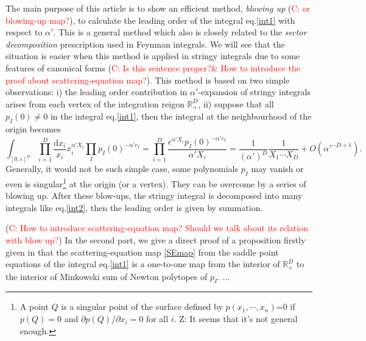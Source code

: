 \documentclass[12pt]{article}
\theoremstyle{definition}
\theoremstyle{plain}
\newcommand{\dif}{\mathrm{d}} %
\begin{document}
The main purpose of this article is to show an efficient method, {\it{blowing up}} (\textcolor{red}{C: or blowing-up map?}), to calculate the leading order of the integral eq.\eqref{int1} with respect to $\alpha'$. This is a general method which also is closely related to the {\it sector decomposition} prescription \cite{} used in Feynman integrals. We will see that the situation is easier when this method is applied in stringy integrals due to some features of canonical forms (\textcolor{red}{C: Is this sentence proper?\& How to introduce the proof about scattering-equation map?}). This method is based on two simple observations: i) the leading order contribution in $\alpha'$-expansion of stringy integrals arises from each vertex of the integration reigon $\mathds{R}_{+}^{D}$, ii) suppose that all $p_I(0)\neq 0$ in the integral eq.\eqref{int1}, then the integral at the neighbourhood of the origin becomes 
\begin{equation}\label{int2}
	\int_{[0,\epsilon]^D}\prod_{i=1}^D\frac{\dif x_i}{x_i}x_i^{\alpha' X_i} \prod_{I}p_{I}(0)^{-\alpha' c_{I}}
	=\prod_{i=1}^D\frac{\epsilon^{\alpha' X_i}p_{I}(0)^{-\alpha' c_{I}}}{\alpha' X_i}
	= \frac{1}{(\alpha')^D}\frac{1}{X_1\cdots X_D}+O(\alpha'^{-D+1}).
\end{equation}
Generally, it would not be such simple case, some polynomials $p_{I}$ may vanish or even is singular\footnote{A point $Q$ is a singular point of the surface defined by $p(x_{1},\cdots,x_{n})$=0 if $p(Q)=0$ and $\partial p(Q)/\partial x_{i} =0$ for all $i$. {\color{blue} Z: It seems that it's not general enough.}} at the origin (or a vertex).
They can be overcome by a series of blowing up. After these blow-ups, the 
stringy integral is decomposed into many integrals like eq.\eqref{int2}, then the leading order is given by summation.

(\textcolor{red}{C: How to introduce scattering-equation map? Should we talk about its relation with blow up?})
In the second part, we give a direct proof of a proposition firstly given in \cite{} that 
the scattering-equation map \eqref{SEmap} from the saddle point equations of the integral eq.\eqref{int1} 
is a one-to-one map from the interior of $\mathbb R_+^D$ to the interior of Minkowski sum of 
Newton polytopes of $p_I$. ...
\end{document}
